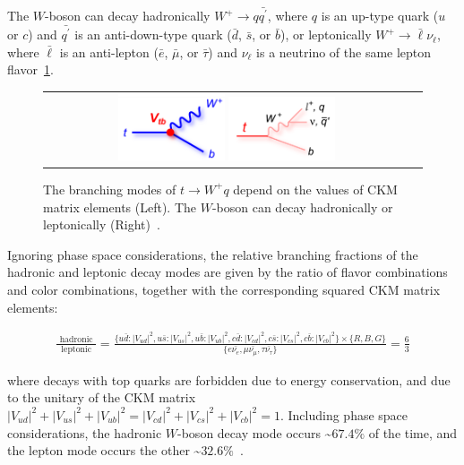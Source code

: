 The $W$-boson can decay hadronically $W^+ \rightarrow q \bar{q^\prime}$, where $q$ is an up-type quark ($u$ or $c$) and $\bar{q^\prime}$ is an anti-down-type quark ($\bar{d}$, $\bar{s}$, or $\bar{b}$), or leptonically $W^+ \rightarrow \bar{\ell} \nu_\ell$, where $\bar{\ell}$ is an anti-lepton ($\bar{e}$, $\bar{\mu}$, or $\bar{\tau}$) and $\nu_\ell$ is a neutrino of the same lepton flavor~\ref{t_decay}.
\begin{figure}[!htb]
  \begin{center}
    \begin{tabular}{cc}
        \includegraphics[width=0.30\textwidth]{fig_TopQuark/feynman_t_decay_Vtb_blue.png}
        \includegraphics[width=0.30\textwidth]{fig_TopQuark/feynman_t_decay_ljetsqq_pink.png}
    \end{tabular}
    \caption{The branching modes of $t \rightarrow W^+ q$ depend on the values of CKM matrix elements (Left).
             The $W$-boson can decay hadronically or leptonically (Right)~\cite{d0_diagrams}.
    }
    \label{t_decay}
  \end{center}
\end{figure}
Ignoring phase space considerations, the relative branching fractions of the hadronic and leptonic decay modes are given by the ratio of flavor combinations and color combinations, together with the corresponding squared CKM matrix elements:
\begin{linenomath*}
{\small
\begin{align}
\frac{\text { hadronic }}{\text { leptonic }}=\frac{ \{ u\bar{d}:{\vert V_{ud} \vert}^2, u\bar{s}:{\vert V_{us} \vert}^2, u\bar{b}:{\vert V_{ub} \vert}^2, c\bar{d}:{\vert V_{cd} \vert}^2, c\bar{s}:{\vert V_{cs} \vert}^2, c\bar{b}:{\vert V_{cb} \vert}^2 \} \times \{ R, B, G\} }{ \{ e \bar{\nu_e }, \mu \bar{\nu_\mu}, \tau \bar{\nu_\tau} \}} = \frac{6}{3}
\end{align}
}%
\end{linenomath*}
where decays with top quarks are forbidden due to energy conservation, and due to the unitary of the CKM matrix ${\vert V_{ud} \vert}^2 + {\vert V_{us} \vert}^2 + {\vert V_{ub} \vert}^2 = {\vert V_{cd} \vert}^2 + {\vert V_{cs} \vert}^2 + {\vert V_{cb} \vert}^2 = 1$.
Including phase space considerations, the hadronic $W$-boson decay mode occurs \sim$67.4 \%$ of the time, and the lepton mode occurs the other \sim$32.6 \%$~\cite{bib:PDG}.

